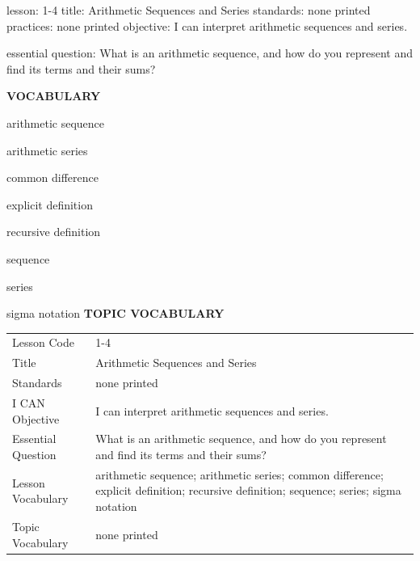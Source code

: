 \documentclass{article}
\newenvironment{lesson-meta}{}{}        %
\newcommand{\te}[1]{}                   %
\begin{document}
\begin{lesson-meta}
lesson: 1-4
title: Arithmetic Sequences and Series
standards: none printed
practices: none printed
objective: I can interpret arithmetic sequences and series.

essential question: What is an arithmetic sequence, and how do you represent and find its terms and their sums?

\textbf{VOCABULARY}
\item arithmetic sequence
\item arithmetic series
\item common difference
\item explicit definition
\item recursive definition
\item sequence
\item series
\item sigma notation
\textbf{TOPIC VOCABULARY}
\te{No topic vocabulary list or numbered standards/practice codes is printed. Objective and Essential Question appear on PDF pages 51 and 52.}
\begin{tabular}{ll}
Lesson Code & 1-4 \\
Title & Arithmetic Sequences and Series \\
Standards & none printed \\
I CAN Objective & I can interpret arithmetic sequences and series. \\
Essential Question & What is an arithmetic sequence, and how do you represent and find its terms and their sums? \\
Lesson Vocabulary & arithmetic sequence; arithmetic series; common difference; explicit definition; recursive definition; sequence; series; sigma notation \\
Topic Vocabulary & none printed \\
\end{tabular}
\end{lesson-meta}
\end{document}
